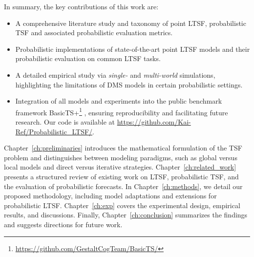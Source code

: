 \documentclass[a4paper,oneside,bibliography=totoc]{scrbook}
\begin{document}
In summary, the key contributions of this work are:
\begin{itemize}
\item A comprehensive literature study and taxonomy of point LTSF, probabilistic TSF and associated probabilistic evaluation metrics.
\item Probabilistic implementations of state-of-the-art point LTSF models and their probabilistic evaluation on common LTSF tasks.
\item A detailed empirical study via \textit{single-} and \textit{multi-world} simulations, highlighting the limitations of DMS models in certain probabilistic settings.
\item Integration of all models and experiments into the public benchmark framework BasicTS+\footnote{\href{https://github.com/GestaltCogTeam/BasicTS/}{\url{https://github.com/GestaltCogTeam/BasicTS/}}} \cite{shao_exploring_2025}, ensuring reproducibility and facilitating future research. Our code is available at \href{https://github.com/Kai-Ref/Probabilistic_LTSF/}{\url{https://github.com/Kai-Ref/Probabilistic_LTSF/}}.
\end{itemize}
Chapter~\ref{ch:preliminaries} introduces the mathematical formulation of the TSF problem and distinguishes between modeling paradigms, such as global versus local models and direct versus iterative strategies. Chapter~\ref{ch:related_work} presents a structured review of existing work on LTSF, probabilistic TSF, and the evaluation of probabilistic forecasts. In Chapter~\ref{ch:methods}, we detail our proposed methodology, including model adaptations and extensions for probabilistic LTSF. Chapter~\ref{ch:exp} covers the experimental design, empirical results, and discussions. Finally, Chapter~\ref{ch:conclusion} summarizes the findings and suggests directions for future work.
\end{document}
